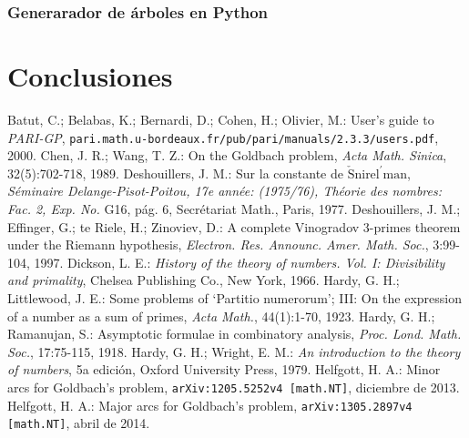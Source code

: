 \documentclass[11pt,a4paper,openright,oneside]{article}
\numberwithin{equation}{section}
\theoremstyle{definition}
\begin{document}
\subsubsection{Generarador de \'arboles en Python}
\newpage


\section{Conclusiones}
\newpage


\begin{thebibliography}{25}
     Batut, C.; Belabas, K.; Bernardi, D.; Cohen, H.; Olivier, M.: User's guide to \textit{PARI-GP},  \newline \texttt{pari.math.u-bordeaux.fr/pub/pari/manuals/2.3.3/users.pdf}, 2000.
     Chen, J. R.; Wang, T. Z.: On the Goldbach problem, \textit{Acta Math. Sinica}, 32(5):702-718, 1989.
     Deshouillers, J. M.: Sur la constante de $\check{\text{S}}\text{nirel}^{\prime} \text{man}$, \textit{S\'eminaire Delange-Pisot-Poitou, 17e ann\'ee: (1975/76), Th\'eorie des nombres: Fac. 2, Exp. No.} G16, p\'ag. 6, Secr\'etariat Math., Paris, 1977.
     Deshouillers, J. M.; Effinger, G.; te Riele, H.; Zinoviev, D.: A complete Vinogradov 3-primes theorem under the Riemann hypothesis, \textit{Electron. Res. Announc. Amer. Math. Soc.}, 3:99-104, 1997.
     Dickson, L. E.: \textit{History of the theory of numbers. Vol. I: Divisibility and primality}, Chelsea Publishing Co., New York, 1966.
     Hardy, G. H.; Littlewood, J. E.: Some problems of \textquoteleft Partitio numerorum\textquoteright; III: On the expression of a number as a sum of primes, \textit{Acta Math.}, 44(1):1-70, 1923.
     Hardy, G. H.; Ramanujan, S.: Asymptotic formulae in combinatory analysis, \textit{Proc. Lond. Math. Soc.}, 17:75-115, 1918.
     Hardy, G. H.; Wright, E. M.: \textit{An introduction to the theory of numbers}, 5a edici\'on, Oxford University Press, 1979.
     Helfgott, H. A.: Minor arcs for Goldbach's problem, \newline \texttt{arXiv:1205.5252v4 [math.NT]}, diciembre de 2013.
     Helfgott, H. A.: Major arcs for Goldbach's problem, \newline \texttt{arXiv:1305.2897v4 [math.NT]}, abril de 2014.

\end{thebibliography}
\end{document}
